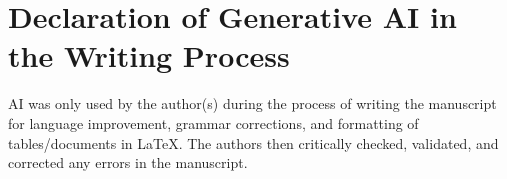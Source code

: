 \documentclass[conference]{IEEEtran}
\begin{document}
\section*{Declaration of Generative AI in the Writing Process}
AI was only used by the author(s) during the process of writing the manuscript for language improvement, grammar corrections, and formatting of tables/documents in LaTeX. The authors then critically checked, validated, and corrected any errors in the manuscript.

{\footnotesize


}
\end{document}
